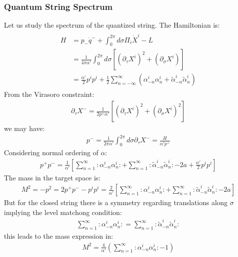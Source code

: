\subsubsection{Quantum String Spectrum}
Let us study the spectrum of the quantized string. The Hamiltonian is:
\begin{align}
    \begin{split}
    H &= p_{-} \dot{q}^{-} +\int _{0}^{2\pi} d\sigma \Pi _{i} \dot{X}^{i} - L \\
    &=\frac{1}{4\pi\alpha'} \int_{0}^{2\pi}d\sigma  \left[ (\partial_{\tau} X^{i})^{2} + (\partial _{\sigma} X^{i})\right] \\
    &= \frac{\alpha'}{2}p^{i}p^{i} + \frac{1}{2} \sum_{n=-\infty}^{\infty} (\alpha_{-n}^{i} \alpha_{n}^{i} + \tilde{\alpha}_{-n} ^{i} \tilde{\alpha} _{n}^{i})
    \end{split}
\end{align}
From the Virasoro constraint:
\begin{align}
    \partial _{\tau} X^{-} = \frac{1}{2p^{+}\alpha'} \left[ (\partial_{\tau}X^{i})^{2} + (\partial _{\sigma} X^{i})^{2}\right]
\end{align}
we may have:
\begin{align}
    p^{-} = \frac{1}{2\pi\alpha'}\int_{0}^{2\pi} d\sigma \partial _{\tau} X^{-} = \frac{H}{\alpha' p^{+}}
\end{align}
Considering normal ordering of $\alpha$:
\begin{align}
    p^{+}p^{-} = \frac{1}{\alpha'} \left[ \sum_{n=1} ^{\infty} :\alpha _{-n}^{i} \alpha_{n}^{i}: + \sum_{n=1}^{\infty} :\tilde{\alpha}_{-n}^{i} \tilde{\alpha} _{n}^{i}: -2a + \frac{\alpha'}{2}p^{i}p^{i} \right]
\end{align}
The mass in the target space is:
\begin{align}
    M^{2} = -p^{2} = 2p^{+}p^{-} -p^{i}p^{i} = \frac{2}{\alpha'} \left[ \sum_{n=1} ^{\infty} :\alpha _{-n}^{i} \alpha_{n}^{i}: + \sum_{n=1}^{\infty} :\tilde{\alpha}_{-n}^{i} \tilde{\alpha} _{n}^{i}: -2a \right]
\end{align}
But for the closed string there is a symmetry regarding translations along $\sigma$ implying the level matchong condition:
\begin{align}
    \sum_{n=1} ^{\infty} :\alpha _{-n}^{i} \alpha_{n}^{i}: = \sum_{n=1}^{\infty} :\tilde{\alpha}_{-n}^{i} \tilde{\alpha} _{n}^{i}:
\end{align}
this leads to the mass expression in:
\begin{align}
    M^{2} = \frac{4}{\alpha'} (\sum_{n=1} ^{\infty} :\alpha _{-n}^{i} \alpha_{n}^{i}: -1)
\end{align}

